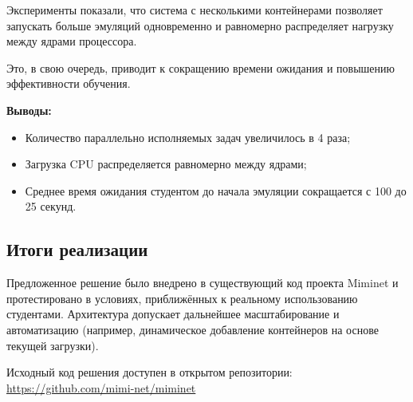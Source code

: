 Эксперименты показали, что система с несколькими контейнерами позволяет запускать больше эмуляций одновременно и равномерно распределяет нагрузку между ядрами процессора.

Это, в свою очередь, приводит к сокращению времени ожидания и повышению эффективности обучения.

\textbf{Выводы:}
\begin{itemize}
  \item Количество параллельно исполняемых задач увеличилось в 4 раза;
  \item Загрузка CPU распределяется равномерно между ядрами;
  \item Среднее время ожидания студентом до начала эмуляции сокращается с 100 до 25 секунд.
\end{itemize}

\subsection{Итоги реализации}
\label{subsec:summary}

Предложенное решение было внедрено в существующий код проекта Miminet и протестировано в условиях, приближённых к реальному использованию студентами. Архитектура допускает дальнейшее масштабирование и автоматизацию (например, динамическое добавление контейнеров на основе текущей загрузки).

Исходный код решения доступен в открытом репозитории: \url{https://github.com/mimi-net/miminet}
